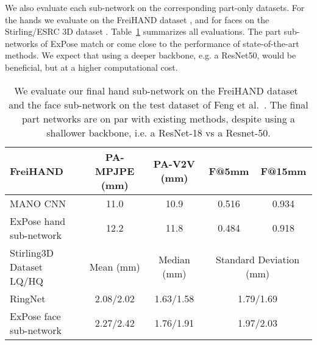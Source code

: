 \documentclass[runningheads]{llncs}
\newcommand{\modelname}{\mbox{ExPose}\xspace}
\newcommand{\stateoftheart}{\mbox{state-of-the-art}\xspace}
\newcommand{\freihand}{\mbox{FreiHAND}\xspace}
\newcommand{\mano}{\mbox{MANO}\xspace}
\newcommand{\resnet}{\mbox{ResNet50}\xspace}
\newcommand{\ringnet}{\mbox{RingNet}\xspace}
\newcommand{\etal}{et al.\xspace}
\newcommand{\ie}{i.e.\xspace}
\begin{document}
 

We also evaluate each sub-network on the corresponding part-only datasets.
For the hands we evaluate on the \freihand dataset \cite{Freihand2019}, and for faces on the Stirling/ESRC 3D dataset \cite{feng2018evaluation}.
Table~\ref{table:parts} summarizes all evaluations.
The part sub-networks of \modelname match or come close to the performance of \stateoftheart methods.
We expect that using a deeper backbone, e.g. a \resnet, would be beneficial,
but at a higher computational cost.

\begin{table}[t!]
    \centering
    \caption{We evaluate our final hand sub-network on the \freihand
        dataset~\cite{Freihand2019} and the face sub-network on the test dataset of Feng
        \etal~\cite{feng2018evaluation}. The final part networks are on par with
        existing methods, despite using a shallower backbone,
        \ie a ResNet-18 vs a Resnet-50.}
    \scriptsize
    \begin{tabular}{l|c|c|c|c}
        \toprule
        \freihand & PA-MPJPE (mm) & PA-V2V (mm) & F@5mm & F@15mm \\
        \midrule
        \mano CNN~\cite{Freihand2019} & 11.0 & 10.9 & 0.516 & 0.934  \\
        \modelname hand sub-network  & 12.2 & 11.8 & 0.484 & 0.918 \\
        \midrule Stirling3D Dataset LQ/HQ & Mean (mm) & Median (mm) & \multicolumn{2}{c}{Standard Deviation (mm)}\\
        \midrule
        \ringnet~\cite{sanyal_2019_cvpr} & 2.08/2.02 & 1.63/1.58 & \multicolumn{2}{c}{1.79/1.69}  \\
        \modelname face sub-network  & 2.27/2.42 & 1.76/1.91 & \multicolumn{2}{c}{1.97/2.03} \\
        \bottomrule \end{tabular}
    \label{table:parts}
\end{table}
\end{document}

